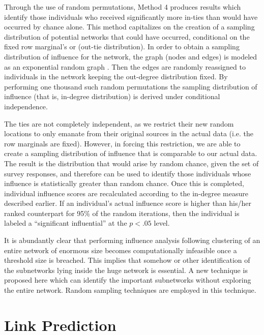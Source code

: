 Through the use of random permutations, Method 4 produces results which identify those individuals who received significantly more in-ties than would have occurred by chance alone. This method capitalizes on the creation of a sampling distribution of potential networks that could have occurred, conditional on the fixed row marginal’s or (out-tie distribution). In order to obtain a sampling distribution of influence for the network, the graph (nodes and edges) is modeled as an exponential random graph \cite{hunter2008ergm}. Then the edges are randomly reassigned to individuals in the network keeping the out-degree distribution fixed. By performing one thousand such random permutations the sampling distribution of influence (that is, in-degree distribution) is derived under conditional independence.
 
The ties are not completely independent, as we restrict their new random locations to only emanate from their original sources in the actual data (i.e. the row marginals are fixed). However, in forcing this restriction, we are able to create a sampling distribution of influence that is comparable to our actual data. The result is the distribution that would arise by random chance, given the set of survey responses, and therefore can be used to identify those individuals whose influence is statistically greater than random chance. Once this is completed, individual influence scores are recalculated according to the in-degree measure described earlier. If an individual’s actual influence score is higher than his/her ranked counterpart for 95\% of the random iterations, then the individual is labeled a “significant influential” at the $p < .05$ level.


It is abundantly clear that performing influence analysis following clustering of an entire
network of enormous size becomes computationally infeasible once a threshold size is breached.
This implies that somehow or other identification of the subnetworks lying inside the
huge network is essential. A new technique is proposed here which can identify the important
subnetworks without exploring the entire network. Random sampling techniques are employed
in this technique. \cite{ross2014introduction}

\section{Link Prediction}\label{SecLP}

